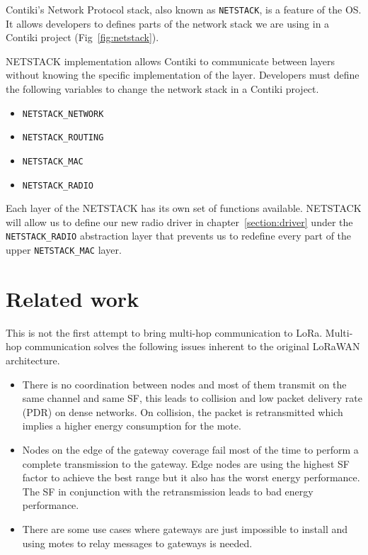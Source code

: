 Contiki's Network Protocol stack, also known as \lstinline{NETSTACK}, is a
feature of the OS.
It allows developers to defines parts of the network stack we are using in a Contiki
project (Fig~\ref{fig:netstack}).

NETSTACK implementation allows Contiki to communicate between layers without
knowing the specific implementation of the layer.
Developers must define the following variables to change the network stack
in a Contiki project.

\begin{itemize}
  \item \lstinline{NETSTACK_NETWORK}
  \item \lstinline{NETSTACK_ROUTING}
  \item \lstinline{NETSTACK_MAC}
  \item \lstinline{NETSTACK_RADIO}
\end{itemize}

Each layer of the NETSTACK has its own set of functions available.
NETSTACK will allow us to define our new radio driver in
chapter~\ref{section:driver} under the \lstinline{NETSTACK_RADIO}
abstraction layer that prevents us to redefine every part of the upper
\lstinline{NETSTACK_MAC} layer.



\section{Related work}

This is not the first attempt to bring multi-hop communication to LoRa.
Multi-hop communication solves the following issues inherent to the original
LoRaWAN architecture.

\begin{itemize}
  \item There is no coordination between nodes and most of them transmit on the
    same channel and same SF, this leads to collision and low packet delivery
    rate (PDR) on dense networks. On collision, the packet is retransmitted
    which implies a higher energy consumption for the mote.
  \item Nodes on the edge of the gateway coverage fail most of the time to
    perform a complete transmission to the gateway. Edge nodes are using the
    highest SF factor to achieve the best range but it also has the worst
    energy performance. The SF in conjunction with the retransmission leads
    to bad energy performance.
  \item There are some use cases where gateways are just impossible to install
    and using motes to relay messages to gateways is needed.
\end{itemize}

